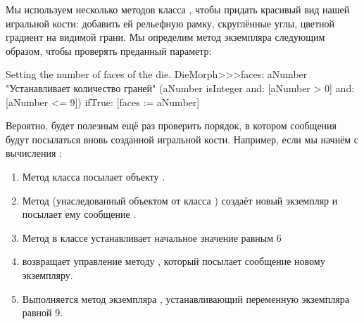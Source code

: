 \documentclass[a4paper,10pt,twoside]{book}
\begin{document}
Мы используем несколько методов класса , чтобы придать красивый вид нашей игральной кости: добавить ей рельефную рамку, скруглённые углы, цветной градиент на видимой грани.
Мы определим метод экземпляра  следующим образом, чтобы проверять преданный параметр:
\begin{method}{Setting the number of faces of the die.}
DieMorph>>>faces: aNumber
	"Устанавливает количество граней"
	(aNumber isInteger
			and: [aNumber > 0]
			and: [aNumber <= 9])
		ifTrue: [faces := aNumber]
\end{method}

Вероятно, будет полезным ещё раз проверить порядок, в котором сообщения будут посылаться вновь созданной игральной кости. Например, если мы начнём с 
вычисления :
\begin{enumerate}
	\item Метод класса  посылает  объекту .
	\item Метод  (унаследованный объектом  от класса ) создаёт новый экземпляр и посылает ему сообщение .
	\item Метод  в классе  устанавливает начальное значение  равным 6
	\item {} возвращает управление методу , который посылает сообщение  новому экземпляру.
	\item Выполняется метод экземпляра , устанавливающий переменную экземпляра  равной 9.
\end{enumerate}
\end{document}
